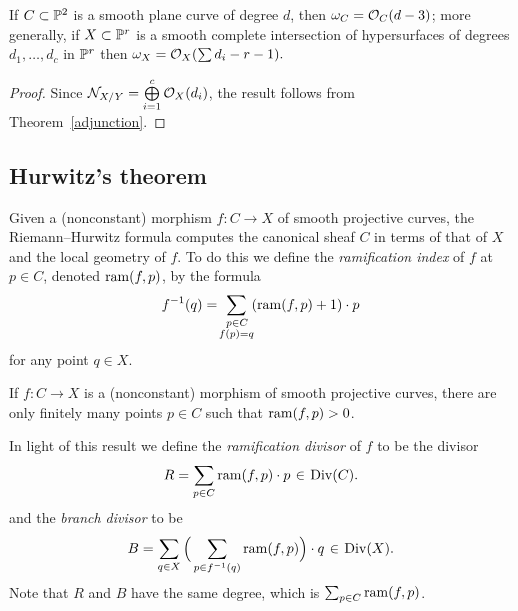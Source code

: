 \begin{corollary}\label{canonical of plane curve}\label{canonical of complete intersection}
If $C\subset {\mathbb P}^{2}$ is a smooth plane curve of degree $d$, then
$\omega_{C} = {\mathcal O}_{C}(d-\nobreak 3)$; more generally, if
$X\subset {\mathbb P}^{r}$ is a smooth complete intersection of hypersurfaces of degrees $d_{1},\dots, d_{c}$ in ${\mathbb P}^r$ then
$\omega_{X} = {\mathcal O}_{X}(\sum d_{i }-r-1).$
\vspace*{-3pt}
\end{corollary}

\begin{proof}
Since ${\mathcal N}_{X/Y} = \bigoplus\limits_{i=1}^{c} {\mathcal O}_{X}(d_{i})$, the result follows from Theorem~\ref{adjunction}.
\end{proof}

\subsection*{Hurwitz's theorem}
 Given a (nonconstant) morphism $f : C \to X$ of smooth projective
 curves, the Riemann--Hurwitz formula computes the canonical sheaf
 $C$ in terms of that of  $X$ and the local geometry of $f$. To do
 this we define the
%
%
%
\emph{ramification index}
of $f$ at $p \in C$,  denoted $\operatorname{ram}(f,p)$, 
by the formula 
$$
 f^{-1}(q) = \!\sum_{\substack{\kern1ptp\in C\\ f(p)=q}}\! (\operatorname{ram}(f,p)+1)\cdot p
 $$
 for any point $q \in X$. 

\begin{proposition}
If $f : C \to X$ is a (nonconstant) morphism  of smooth projective curves,
there are only finitely many
points $p\in C$ such that $\operatorname{ram}(f,p)>0$.
\end{proposition}

In light of this result we define the \emph{ramification divisor}
%
of $f$ to be the divisor
 $$
 R = \sum_{p \in C} \ram(f,p)\cdot p \; \in \;  \Div(C).
 $$
 and the \emph{branch divisor} to be
%
 $$
 B = \sum_{q \in X} \Big(\sum_{p \in f^{-1}(q)} \ram(f,p) \Big)\cdot q \; \in \; \Div(X).
 $$
Note that $R$ and $B$ have the same degree, which is $\sum_{p \in C} \operatorname{ram}(f,p)$.

